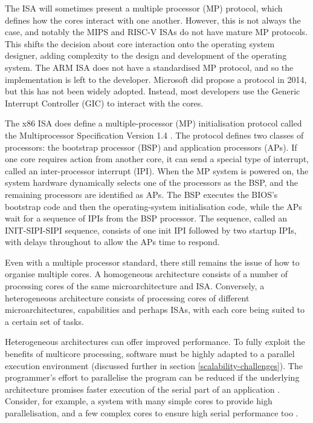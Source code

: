 \documentclass[bsc,frontabs,twoside,singlespacing,parskip,deptreport]{infthesis}     %
\begin{document}
The ISA will sometimes present a multiple processor (MP) protocol, which defines how the cores interact with one another. However, this is not always the case, and notably the MIPS and RISC-V ISAs do not have mature MP protocols. This shifts the decision about core interaction onto the operating system designer, adding complexity to the design and development of the operating system. The ARM ISA does not have a standardised MP protocol, and so the implementation is left to the developer. Microsoft did propose a protocol in 2014, but this has not been widely adopted. Instead, most developers use the Generic Interrupt Controller (GIC) to interact with the cores.

The x86 ISA does define a multiple-processor (MP) initialisation protocol called the Multiprocessor Specification Version 1.4 \cite{intel-sys-prog-guide}. The protocol defines two classes of processors: the bootstrap processor (BSP) and application processors (APs). If one core requires action from another core, it can send a special type of interrupt, called an inter-processor interrupt (IPI). When the MP system is powered on, the system hardware dynamically selects one of the processors as the BSP, and the remaining processors are identified as APs. The BSP executes the BIOS’s bootstrap code and then the operating-system initialisation code, while the APs wait for a sequence of IPIs from the BSP processor. The sequence, called an INIT-SIPI-SIPI sequence, consists of one init IPI followed by two startup IPIs, with delays throughout to allow the APs time to respond.

Even with a multiple processor standard, there still remains the issue of how to organise multiple cores. A homogeneous architecture consists of a number of processing cores of the same microarchitecture and ISA. Conversely, a heterogeneous architecture consists of processing cores of different microarchitectures, capabilities and perhaps ISAs, with each core being suited to a certain set of tasks.

Heterogeneous architectures can offer improved performance. To fully exploit the benefits of multicore processing, software must be highly adapted to a parallel execution environment (discussed further in section \ref{scalability-challenges}). The programmer's effort to parallelise the program can be reduced if the underlying architecture promises faster execution of the serial part of an application \cite{suleman_2007}. Consider, for example, a system with many simple cores to provide high parallelisation, and a few complex cores to ensure high serial performance too \cite{balakrishnan_2005}. 
\end{document}

